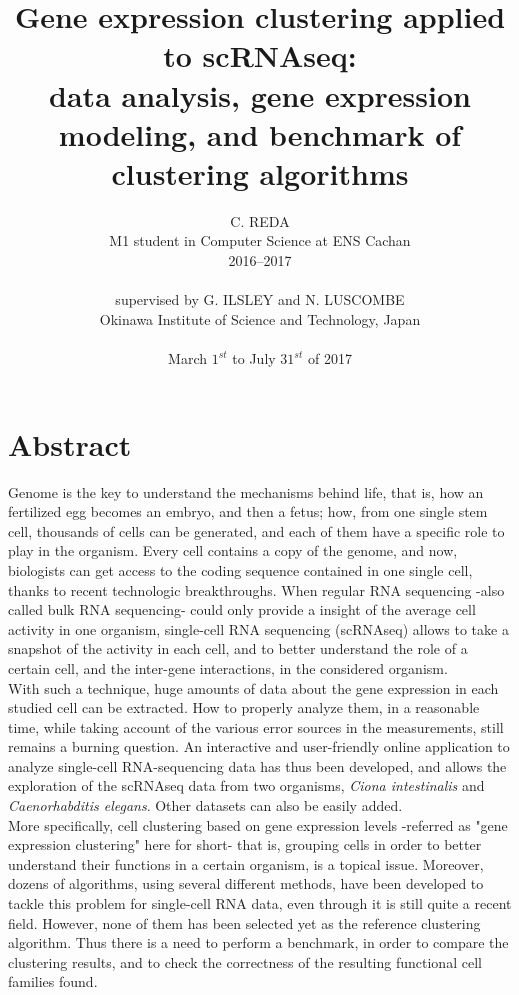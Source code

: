 \documentclass{report}
\title{Gene expression clustering applied to scRNAseq:\\data analysis, gene expression modeling, and benchmark of clustering algorithms}
\author{C. REDA\\M1 student in Computer Science at ENS Cachan\\2016--2017 \\ \\ supervised by G. ILSLEY and N. LUSCOMBE\\Okinawa Institute of Science and Technology, Japan\\ \\March $1^{st}$ to July $31^{st}$ of 2017}
\date{}
\begin{document}
\maketitle
{}

\chapter*{Abstract}

Genome is the key to understand the mechanisms behind life, that is, how an fertilized egg becomes an embryo, and then a fetus; how, from one single stem cell, thousands of cells can be generated, and each of them have a specific role to play in the organism. Every cell contains a copy of the genome, and now, biologists can get access to the coding sequence contained in one single cell, thanks to recent technologic breakthroughs. When regular RNA sequencing -also called bulk RNA sequencing- could only provide a insight of the average cell activity in one organism, single-cell RNA sequencing (scRNAseq) allows to take a snapshot of the activity in each cell, and to better understand the role of a certain cell, and the inter-gene interactions, in the considered organism. \\

With such a technique, huge amounts of data about the gene expression in each studied cell can be extracted. How to properly analyze them, in a reasonable time, while taking account of the various error sources in the measurements, still remains a burning question. An interactive and user-friendly online application to analyze single-cell RNA-sequencing data has thus been developed, and allows the exploration of the scRNAseq data from two organisms, \textit{Ciona intestinalis} and \textit{Caenorhabditis elegans}. Other datasets can also be easily added.\\

More specifically, cell clustering based on gene expression levels -referred as "gene expression clustering" here for short- that is, grouping cells in order to better understand their functions in a certain organism, is a topical issue. Moreover, dozens of algorithms, using several different methods, have been developed to tackle this problem for single-cell RNA data, even through it is still quite a recent field. However, none of them has been selected yet as the reference clustering algorithm. Thus there is a need to perform a benchmark, in order to compare the clustering results, and to check the correctness of the resulting functional cell families found.\\
\end{document}
